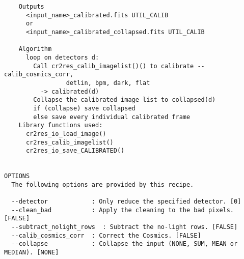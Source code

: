 \begin{verbatim}
    Outputs                                                               
      <input_name>_calibrated.fits UTIL_CALIB          
      or                                                                  
      <input_name>_calibrated_collapsed.fits UTIL_CALIB
                                                                          
    Algorithm                                                             
      loop on detectors d:                                                
        Call cr2res_calib_imagelist()() to calibrate --calib_cosmics_corr,
                 detlin, bpm, dark, flat                                  
          -> calibrated(d)                                                
        Collapse the calibrated image list to collapsed(d)                
        if (collapse) save collapsed                                      
        else save every individual calibrated frame                       
    Library functions used:                                               
      cr2res_io_load_image()                                              
      cr2res_calib_imagelist()                                            
      cr2res_io_save_CALIBRATED()                                         
  

OPTIONS
  The following options are provided by this recipe.

  --detector            : Only reduce the specified detector. [0]
  --clean_bad           : Apply the cleaning to the bad pixels. [FALSE]
  --subtract_nolight_rows  : Subtract the no-light rows. [FALSE]
  --calib_cosmics_corr  : Correct the Cosmics. [FALSE]
  --collapse            : Collapse the input (NONE, SUM, MEAN or MEDIAN). [NONE]

\end{verbatim}
